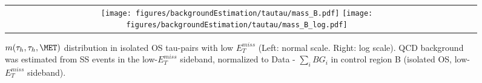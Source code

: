 \begin{table}[!htpb]
   \caption{ Yields in the controls region 1(B) and 1(D) used for calculation of OS/LS ratio.}
   \label{table:OLSStable} %
 \end{table}

\begin{figure}[tbhp!]
      \centering
      \begin{tabular}{cc}
        
        \texttt{[image: figures/backgroundEstimation/tautau/mass\_B.pdf]}
        \texttt{[image: figures/backgroundEstimation/tautau/mass\_B\_log.pdf]}
      \end{tabular}
      \caption{$m(\tau_{h},\tau_{h},\MET)$ distribution in isolated OS tau-pairs with low $E^{miss}_{T}$ (Left: normal scale. Right:
log scale). QCD background was estimated from SS events in the low-$E^{miss}_{T}$ sideband, normalized to 
Data - $\sum\limits_{i} BG_{i}$ in control region B (isolated OS, low-$E^{miss}_{T}$ sideband).}
    \label{fig:MG304}
 \end{figure}


